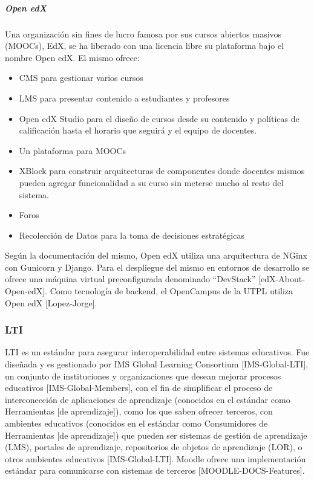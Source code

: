 \subparagraph{Open edX}
Una organización sin fines de lucro famosa por sus cursos abiertos masivos (MOOCs), EdX, se ha liberado con una licencia libre su plataforma bajo el nombre Open edX. El mismo ofrece:
\begin{itemize}
	\item CMS para gestionar varios cursos
    \item LMS para presentar contenido a estudiantes y profesores
    \item Open edX Studio para el diseño de cursos desde su contenido y políticas de calificación hasta el horario que seguirá y el equipo de docentes.
    \item Un plataforma para MOOCs
    \item XBlock para construir arquitecturas de componentes donde docentes mismos pueden agregar funcionalidad a su curso sin meterse mucho al resto del sistema.
    \item Foros
    \item Recolección de Datos para la toma de decisiones estratégicas
\end{itemize}
Según la documentación del mismo, Open edX utiliza una arquitectura de NGinx con Gunicorn y Django. Para el despliegue del mismo en entornos de desarrollo se ofrece una máquina virtual preconfigurada denominado “DevStack” [edX-About-Open-edX]. Como tecnología de backend, el OpenCampus de la UTPL utiliza Open edX [Lopez-Jorge].

\subsubsection{LTI}
LTI es un estándar para asegurar interoperabilidad entre sistemas educativos. Fue diseñada y es gestionado por IMS Global Learning Consortium [IMS-Global-LTI], un conjunto de instituciones y organizaciones que desean mejorar procesos educativos [IMS-Global-Members], con el fin de simplificar el proceso de interconección de aplicaciones de aprendizaje (conocidos en el estándar como Herramientas [de aprendizaje]), como los que saben ofrecer terceros, con ambientes educativos (conocidos en el estándar como Consumidores de Herramientas [de aprendizaje]) que pueden ser sistemas de gestión de aprendizaje (LMS), portales de aprendizaje, repositorios de objetos de aprendizaje (LOR), o otros ambientes educativos [IMS-Global-LTI]. Moodle ofrece una implementación estándar para comunicarse con sistemas de terceros [MOODLE-DOCS-Features].


